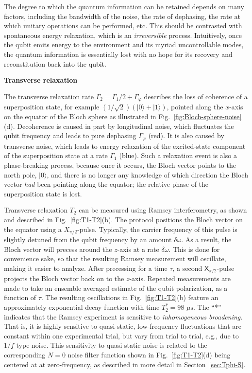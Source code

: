 \documentclass[aip,apr,twocolumn,showpacs,superscriptaddress,groupedaddress,nofootinbib,reprint]{revtex4-1}  %
\newcommand{\X}[1]{\textsf{X}_{#1}}
\begin{document}
The degree to which the quantum information can be retained depends on many factors, including the bandwidth of the noise, the rate of dephasing, the rate at which unitary operations can be performed, etc. This should be contrasted with spontaneous energy relaxation, which is an \textit{irreversible} process. Intuitively, once the qubit emits energy to the environment and its myriad uncontrollable modes, the quantum information is essentially lost with no hope for its recovery and reconstitution back into the qubit.

\textbf{Transverse relaxation}

\noindent The transverse relaxation rate $\Gamma_2=\Gamma_1/2 + \Gamma_{\varphi}$ describes the loss of coherence of a superposition state, for example $(1/\sqrt{2})(\lvert 0 \rangle + \lvert 1 \rangle)$, pointed along the $x$-axis on the equator of the Bloch sphere as illustrated in Fig.~\ref{fig:Bloch-sphere-noise}(d). Decoherence is caused in part by longitudinal noise, which fluctuates the qubit frequency and leads to pure dephasing $\Gamma_{\varphi}$ (red). It is also caused by transverse noise, which leads to energy relaxation of the excited-state component of the superposition state at a rate $\Gamma_1$ (blue). Such a relaxation event is also a phase-breaking process, because once it occurs, the Bloch vector points to the north pole, $\lvert 0 \rangle$, and there is no longer any knowledge of which direction the Bloch vector \textit{had} been pointing along the equator; the relative phase of the superposition state is lost.

Transverse relaxation $T_2$ can be measured using Ramsey interferometry, as shown and described in Fig.~\ref{fig:T1-T2}(b). The protocol positions the Bloch vector on the equator using a $X_{\pi/2}$-pulse. Typically, the carrier frequency of this pulse is slightly detuned from the qubit frequency by an amount $\delta \omega$. As a result, the Bloch vector will precess around the $z$-axis at a rate $\delta \omega$. This is done for convenience sake, so that the resulting Ramsey measurement will oscillate, making it easier to analyze. After precessing for a time $\tau$, a second $\X{\pi/2}$-pulse projects the Bloch vector back on to the $z$-axis. Repeated measurements are made to take an ensemble averaged estimate of the qubit polarization, as a function of $\tau$. The resulting oscillations in Fig.~\ref{fig:T1-T2}(b) feature an approximately exponential decay function with time $T_2^* = 98$ $\mu\mathrm{s}$. The ``*'' indicates that the Ramsey experiment is sensitive to \textit{inhomogeneous broadening}. That is, it is highly sensitive to quasi-static, low-frequency fluctuations that are constant within one experimental trial, but vary from trial to trial, e.g., due to $1/f$-type noise. This sensitivity to quasi-static noise is related to the corresponding $N=0$ noise filter function shown in Fig.~\ref{fig:T1-T2}(d) being centered at at zero-frequency, as described in more detail in Section~\ref{sec:Tphi-S}.
\end{document}
